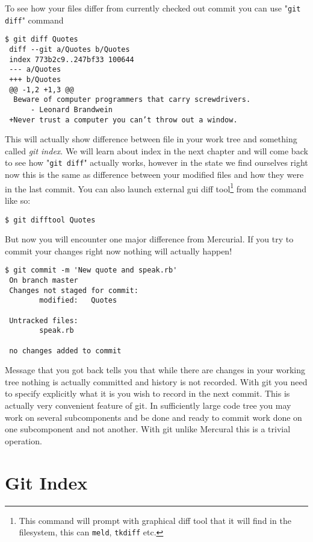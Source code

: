 \documentclass{article}
\theoremstyle{definition}
\begin{document}
        \noindent To see how your files differ from currently checked out commit you can use "\texttt{git diff}" command
    \begin{Verbatim}[frame=single]
 $ git diff Quotes
 diff --git a/Quotes b/Quotes
 index 773b2c9..247bf33 100644
 --- a/Quotes
 +++ b/Quotes
 @@ -1,2 +1,3 @@
  Beware of computer programmers that carry screwdrivers.
      - Leonard Brandwein
 +Never trust a computer you can’t throw out a window.
        \end{Verbatim}
        This will actually show difference between file in your work tree and something called {\em git index}. We will
        learn about index in the next chapter and will come back to see how "\texttt{git diff}" actually works, however in
        the state we find ourselves right now this is the same as difference between your modified files and how they
        were in the last commit. You can also launch external gui diff tool\footnote{This command will prompt with
          graphical diff tool that it will find in the filesystem, this can \texttt{meld}, \texttt{tkdiff} etc.} from
        the command like so:

        \begin{Verbatim}[frame=single]
 $ git difftool Quotes
        \end{Verbatim}
        But now you will encounter one major difference from Mercurial. If you try to commit your changes right now
        nothing will actually happen!

    \begin{Verbatim}[frame=single]
 $ git commit -m 'New quote and speak.rb'
 On branch master
 Changes not staged for commit:
        modified:   Quotes

 Untracked files:
        speak.rb

 no changes added to commit
        \end{Verbatim}
        Message that you got back tells you that while there are changes in your working tree nothing is actually
        committed and history is not recorded. With git you need to specify explicitly what it is you wish to record
        in the next commit. This is actually very convenient feature of git. In sufficiently large code tree you may
        work on several subcomponents and be done and ready to commit work done on one subcomponent and not another.
        With git unlike Mercural this is a trivial operation.

        \section{Git Index}
\end{document}
